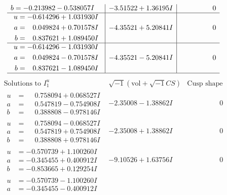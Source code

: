 \documentclass[1p]{elsarticle_modified}
\theoremstyle{definition}
\newcommand{\I}{\sqrt{-1}}
\begin{document}
$$\begin{array}{c|c|c}
\begin{aligned}
b &= -0.213982 - 0.538057 I\end{aligned}
 & -3.51522 + 1.36195 I & \phantom{-0.000000 } 0 \\ \hline\begin{aligned}
u &= -0.614296 + 1.031930 I \\
a &= \phantom{-}0.049824 + 0.701578 I \\
b &= \phantom{-}0.837621 + 1.089450 I\end{aligned}
 & -4.35521 + 5.20841 I & \phantom{-0.000000 } 0 \\ \hline\begin{aligned}
u &= -0.614296 - 1.031930 I \\
a &= \phantom{-}0.049824 - 0.701578 I \\
b &= \phantom{-}0.837621 - 1.089450 I\end{aligned}
 & -4.35521 - 5.20841 I & \phantom{-0.000000 } 0\\
 \hline 
 \end{array}$$\newpage$$\begin{array}{c|c|c}  
\text{Solutions to }I^u_{1}& \I (\text{vol} + \sqrt{-1}CS) & \text{Cusp shape}\\
 \hline 
\begin{aligned}
u &= \phantom{-}0.758094 + 0.068527 I \\
a &= \phantom{-}0.547819 - 0.754908 I \\
b &= \phantom{-}0.388808 - 0.978146 I\end{aligned}
 & -2.35008 - 1.38862 I & \phantom{-0.000000 } 0 \\ \hline\begin{aligned}
u &= \phantom{-}0.758094 - 0.068527 I \\
a &= \phantom{-}0.547819 + 0.754908 I \\
b &= \phantom{-}0.388808 + 0.978146 I\end{aligned}
 & -2.35008 + 1.38862 I & \phantom{-0.000000 } 0 \\ \hline\begin{aligned}
u &= -0.570739 + 1.100260 I \\
a &= -0.345455 + 0.400912 I \\
b &= -0.853665 + 0.129254 I\end{aligned}
 & -9.10526 + 1.63756 I & \phantom{-0.000000 } 0 \\ \hline\begin{aligned}
u &= -0.570739 - 1.100260 I \\
a &= -0.345455 - 0.400912 I \\

\end{aligned}
\end{array}$$
\end{document}
